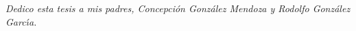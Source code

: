 \begin{titlepage}

\vspace*{7cm}

\begin{center}

{\sl Dedico esta tesis a mis padres, Concepci\'on Gonz\'alez Mendoza y Rodolfo Gonz\'alez %
Garc\'{\i}a.}

\end{center}

\end{titlepage}
